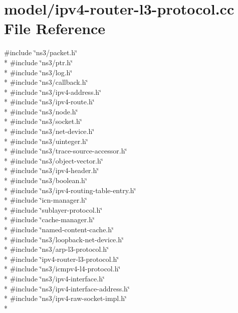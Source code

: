 \hypertarget{ipv4-router-l3-protocol_8cc}{\section{model/ipv4-\/router-\/l3-\/protocol.cc File Reference}
\label{ipv4-router-l3-protocol_8cc}
}
{\ttfamily \#include \char`\"{}ns3/packet.\-h\char`\"{}}\\*
{\ttfamily \#include \char`\"{}ns3/ptr.\-h\char`\"{}}\\*
{\ttfamily \#include \char`\"{}ns3/log.\-h\char`\"{}}\\*
{\ttfamily \#include \char`\"{}ns3/callback.\-h\char`\"{}}\\*
{\ttfamily \#include \char`\"{}ns3/ipv4-\/address.\-h\char`\"{}}\\*
{\ttfamily \#include \char`\"{}ns3/ipv4-\/route.\-h\char`\"{}}\\*
{\ttfamily \#include \char`\"{}ns3/node.\-h\char`\"{}}\\*
{\ttfamily \#include \char`\"{}ns3/socket.\-h\char`\"{}}\\*
{\ttfamily \#include \char`\"{}ns3/net-\/device.\-h\char`\"{}}\\*
{\ttfamily \#include \char`\"{}ns3/uinteger.\-h\char`\"{}}\\*
{\ttfamily \#include \char`\"{}ns3/trace-\/source-\/accessor.\-h\char`\"{}}\\*
{\ttfamily \#include \char`\"{}ns3/object-\/vector.\-h\char`\"{}}\\*
{\ttfamily \#include \char`\"{}ns3/ipv4-\/header.\-h\char`\"{}}\\*
{\ttfamily \#include \char`\"{}ns3/boolean.\-h\char`\"{}}\\*
{\ttfamily \#include \char`\"{}ns3/ipv4-\/routing-\/table-\/entry.\-h\char`\"{}}\\*
{\ttfamily \#include \char`\"{}icn-\/manager.\-h\char`\"{}}\\*
{\ttfamily \#include \char`\"{}sublayer-\/protocol.\-h\char`\"{}}\\*
{\ttfamily \#include \char`\"{}cache-\/manager.\-h\char`\"{}}\\*
{\ttfamily \#include \char`\"{}named-\/content-\/cache.\-h\char`\"{}}\\*
{\ttfamily \#include \char`\"{}ns3/loopback-\/net-\/device.\-h\char`\"{}}\\*
{\ttfamily \#include \char`\"{}ns3/arp-\/l3-\/protocol.\-h\char`\"{}}\\*
{\ttfamily \#include \char`\"{}ipv4-\/router-\/l3-\/protocol.\-h\char`\"{}}\\*
{\ttfamily \#include \char`\"{}ns3/icmpv4-\/l4-\/protocol.\-h\char`\"{}}\\*
{\ttfamily \#include \char`\"{}ns3/ipv4-\/interface.\-h\char`\"{}}\\*
{\ttfamily \#include \char`\"{}ns3/ipv4-\/interface-\/address.\-h\char`\"{}}\\*
{\ttfamily \#include \char`\"{}ns3/ipv4-\/raw-\/socket-\/impl.\-h\char`\"{}}\\*
